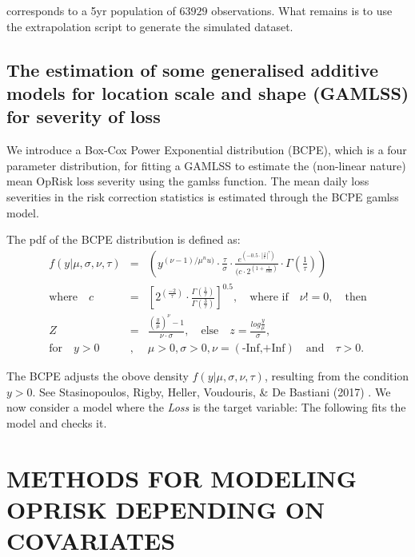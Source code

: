 \documentclass{DissertateUSU}
\begin{document}
corresponds to a 5yr population of \(63929\) observations. What remains
is to use the extrapolation script to generate the simulated dataset.

\section{The estimation of some  generalised additive models for location scale and shape (GAMLSS) for severity of loss}
\label{sec:The estimation of some  generalised additive models for location scale and shape (GAMLSS) for severity of loss}

We introduce a Box-Cox Power Exponential distribution (BCPE), which is a
four parameter distribution, for fitting a GAMLSS to estimate the
(non-linear nature) mean OpRisk loss severity using the gamlss function.
The mean daily loss severities in the risk correction statistics is
estimated through the BCPE gamlss model.\medskip

The pdf of the BCPE distribution is defined as: \singlespacing
\begin{eqnarray}
f(y|\mu,\sigma,\nu,\tau)&=&(y^{(\nu-1)/\mu^nu)}\cdot{\frac{\tau}{\sigma}}\cdot \frac{e^(-0.5\cdot|\frac{z}{c}|^\tau)}{(c\cdot 2^(1+\frac{1}{tau})}\cdot \Gamma(\frac{1}{\tau}))\nonumber\\
\mbox{where} \quad c&=&[2^(\frac{-2}{\tau})\cdot\frac{\Gamma(\frac{1}{\tau})}{\Gamma(\frac{3}{\tau})}]^{0.5},\quad \mbox{where if}\quad \nu!=0, \quad \mbox{then} \nonumber\\
Z&=&\frac{(\frac{y}{\mu})^\nu-1}{\nu\cdot \sigma},\quad \mbox{else} \quad z=\frac{log\frac{y}{\mu}}{\sigma},\nonumber\\
\mbox{for} \quad y>0 &,& \mu>0, \sigma>0, \nu=(\mbox{-Inf,+Inf})\quad \mbox{and}\quad \tau>0.
\end{eqnarray} \doublespacing

The BCPE adjusts the obove density \(f(y|\mu,\sigma,\nu,\tau)\),
resulting from the condition \(y>0\). See Stasinopoulos, Rigby, Heller,
Voudouris, \& De Bastiani (2017) . We now consider a model where the
\emph{Loss} is the target variable: The following fits the model and
checks it.\medskip

\singlespacing

\FloatBarrier
\newpage
{}
\fancyhead[R]{\thepage}
\fancyfoot[C]{}

\chapter{METHODS FOR MODELING OPRISK DEPENDING ON COVARIATES}
\label{METHODS FOR MODELING OPRISK DEPENDING ON COVARIATES}
\end{document}
